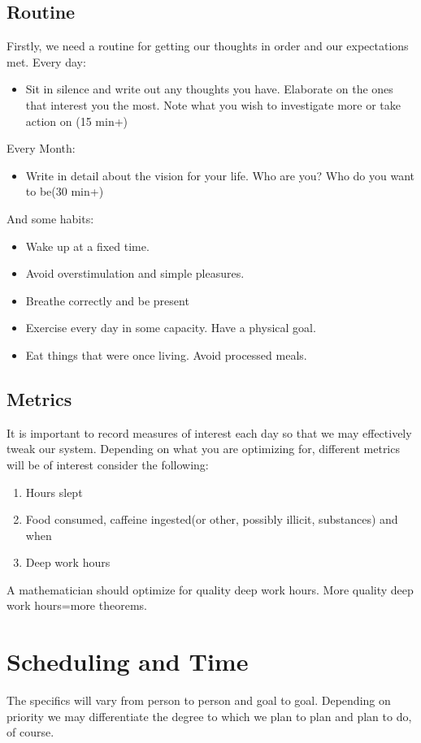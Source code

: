 \documentclass{book}
\numberwithin{equation}{section}
\begin{document}
\subsection{Routine}
Firstly, we need a routine for getting our thoughts in order and our expectations met. 
Every day:
\begin{itemize}
    \item Sit in silence and write out any thoughts you have. Elaborate on the ones that interest you the most. Note what you wish to investigate more or take action on (15 min+)
\end{itemize}
Every Month:
\begin{itemize}
    \item Write in detail about the vision for your life. Who are you? Who do you want to be(30 min+)
\end{itemize}
And some habits:
\begin{itemize}
    \item Wake up at a fixed time.
    \item Avoid overstimulation and simple pleasures. 
    \item Breathe correctly and be present
    \item Exercise every day in some capacity. Have a physical goal.
    \item Eat things that were once living. Avoid processed meals. 
    \end{itemize}
\subsection{Metrics}
It is important to record measures of interest each day so that we may effectively tweak our system. Depending on what you are optimizing for, different metrics will be of interest consider the following:
\begin{enumerate}
    \item Hours slept
    \item Food consumed, caffeine ingested(or other, possibly illicit, substances) and when
    \item Deep work hours
\end{enumerate}
A mathematician should optimize for quality deep work hours. More quality deep work hours=more theorems.
\section{Scheduling and Time}
The specifics will vary from person to person and goal to goal. Depending on priority we may differentiate the degree to which we plan to plan and plan to do, of course.
\end{document}

